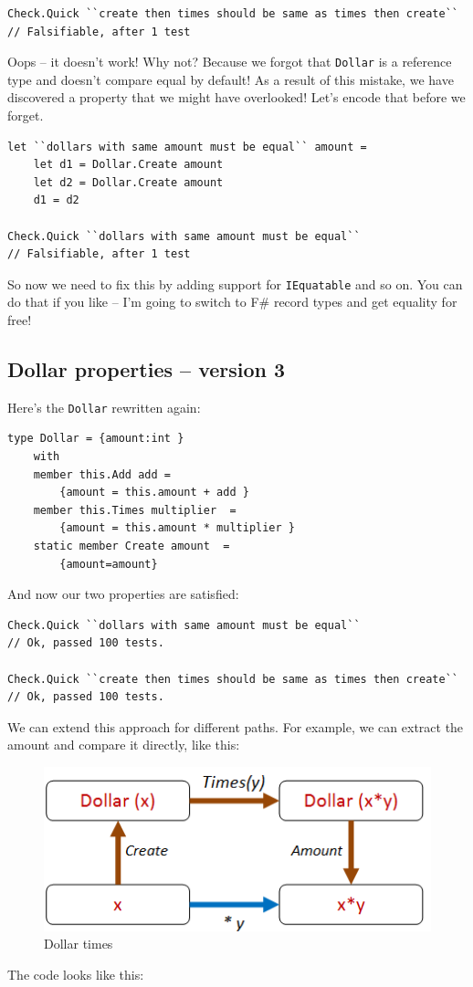 \begin{verbatim}
Check.Quick ``create then times should be same as times then create``
// Falsifiable, after 1 test
\end{verbatim}
Oops -- it doesn't work!
Why not? Because we forgot that \texttt{Dollar} is a reference type and
doesn't compare equal by default!
As a result of this mistake, we have discovered a property that we might
have overlooked! Let's encode that before we forget.

\begin{verbatim}
let ``dollars with same amount must be equal`` amount = 
	let d1 = Dollar.Create amount 
	let d2 = Dollar.Create amount 
	d1 = d2

Check.Quick ``dollars with same amount must be equal`` 
// Falsifiable, after 1 test
\end{verbatim}
So now we need to fix this by adding support for \texttt{IEquatable} and
so on.
You can do that if you like -- I'm going to switch to F\# record types
and get equality for free!

\subsection{Dollar properties -- version
3}\label{dollar-properties-version-3}

Here's the \texttt{Dollar} rewritten again:

\begin{verbatim}
type Dollar = {amount:int } 
	with 
	member this.Add add = 
		{amount = this.amount + add }
	member this.Times multiplier  = 
		{amount = this.amount * multiplier }
	static member Create amount  = 
		{amount=amount}
\end{verbatim}
And now our two properties are satisfied:

\begin{verbatim}
Check.Quick ``dollars with same amount must be equal`` 
// Ok, passed 100 tests.

Check.Quick ``create then times should be same as times then create``
// Ok, passed 100 tests.
\end{verbatim}
We can extend this approach for different paths. For example, we can
extract the amount and compare it directly, like this:
\begin{figure}[htbp]
\centering
\includegraphics{pics/property_dollar_times2.png}
\caption{Dollar times}
\end{figure}
The code looks like this:

